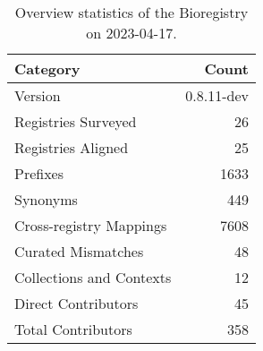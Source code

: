 \begin{table}
\caption{Overview statistics of the Bioregistry on 2023-04-17.}
\label{tab:bioregistry-summary}
\begin{tabular}{lr}
\toprule
Category & Count \\
\midrule
Version & 0.8.11-dev \\
Registries Surveyed & 26 \\
Registries Aligned & 25 \\
Prefixes & 1633 \\
Synonyms & 449 \\
Cross-registry Mappings & 7608 \\
Curated Mismatches & 48 \\
Collections and Contexts & 12 \\
Direct Contributors & 45 \\
Total Contributors & 358 \\
\bottomrule
\end{tabular}
\end{table}
